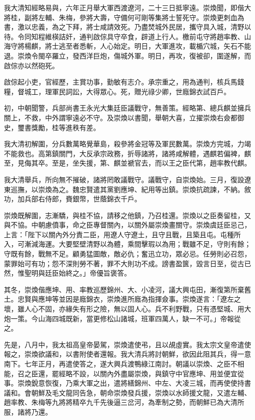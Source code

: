 \begin{pinyinscope}
我大清知經略易與，六年正月舉大軍西渡遼河，二十三日抵寧遠。崇煥聞，即偕大將桂，副將左輔、朱梅，參將大壽，守備何可剛等集將士誓死守。崇煥更刺血為書，激以忠義，為之下拜，將士咸請效死。乃盡焚城外民居，攜守具入城，清野以待。令同知程維楧詰奸，通判啟倧具守卒食，辟道上行人。檄前屯守將趙率教、山海守將楊麒，將士逃至者悉斬，人心始定。明日，大軍進攻，載楯穴城，矢石不能退。崇煥令閩卒羅立，發西洋巨炮，傷城外軍。明日，再攻，復被卻，圍遂解，而啟倧亦以然砲死。

啟倧起小吏，官經歷，主賞功事，勤敏有志介。承宗重之，用為通判，核兵馬錢糧，督城工，理軍民詞訟，大得眾心。死，贈光祿少卿，世廕錦衣試百戶。

初，中朝聞警，兵部尚書王永光大集廷臣議戰守，無善策。經略第、總兵麒並擁兵關上，不救，中外謂寧遠必不守。及崇煥以書聞，舉朝大喜，立擢崇煥右僉都御史，璽書獎勵，桂等進秩有差。

我大清初解圍，分兵數萬略覺華島，殺參將金冠等及軍民數萬。崇煥方完城，力竭不能救也。高第鎮關門，大反承宗政務，折辱諸將，諸將咸解體，遇麒若偏裨，麒至，見侮其卒。至是，坐失援，第、麒並褫官去，而以王之臣代第，趙率教代麒。

我大清舉兵，所向無不摧破，諸將罔敢議戰守。議戰守，自崇煥始。三月，復設遼東巡撫，以崇煥為之。魏忠賢遣其黨劉應坤、紀用等出鎮。崇煥抗疏諫，不納。敘功，加兵部右侍郎，賚銀幣，世蔭錦衣千戶。

崇煥既解圍，志漸驕，與桂不協，請移之他鎮，乃召桂還。崇煥以之臣奏留桂，又與不協。中朝慮僨事，命之臣專督關內，以關外屬崇煥畫關守。崇煥虞廷臣忌己，上言：「陛下以關內外分責二臣，用遼人守遼土，且守且戰，且築且屯。屯種所入，可漸減海運。大要堅壁清野以為體，乘間擊瑕以為用；戰雖不足，守則有餘；守既有餘，戰無不足。顧勇猛圖敵，敵必仇；奮迅立功，眾必忌。任勞則必召怨，蒙罪始可有功；怨不深則勞不著，罪不大則功不成。謗書盈篋，毀言日至，從古已然，惟聖明與廷臣始終之。」帝優旨褒答。

其冬，崇煥偕應坤、用、率教巡歷錦州、大、小凌河，議大興屯田，漸復第所棄舊土。忠賢與應坤等並因是廕錦衣，崇煥進所廕為指揮僉事。崇煥遂言：「遼左之壞，雖人心不固，亦緣失有形之險，無以固人心。兵不利野戰，只有憑堅城、用大炮一策。今山海四城既新，當更修松山諸城，班軍四萬人，缺一不可。」帝報從之。

先是，八月中，我太祖高皇帝晏駕，崇煥遣使弔，且以覘虛實。我太宗文皇帝遣使報之，崇煥欲議和，以書附使者還報。我大清兵將討朝鮮，欲因此阻其兵，得一意南下。七年正月，再遣使答之，遂大興兵渡鴨綠江南討。朝議以崇煥、之臣不相能，召之臣還，罷經略不設，以關內外盡屬崇煥，與鎮守中官應坤、用並便宜從事。崇煥銳意恢復，乃乘大軍之出，遣將繕錦州、中左、大凌三城，而再使使持書議和。會朝鮮及毛文龍同告急，朝命崇煥發兵援，崇煥以水師援文龍，又遣左輔、趙率教、朱梅等九將將精卒九千先後逼三岔河，為牽制之勢，而朝鮮已為大清所服，諸將乃還。


\end{pinyinscope}
